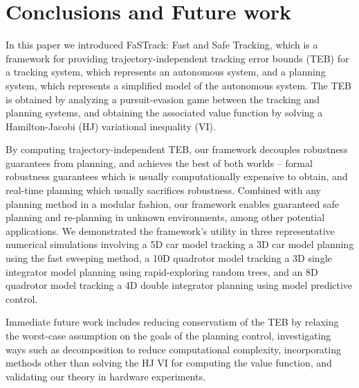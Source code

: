 \section{Conclusions and Future work}
In this paper we introduced FaSTrack: Fast and Safe Tracking, which is a framework for providing trajectory-independent tracking error bounds (TEB) for a tracking system, which represents an autonomous system, and a planning system, which represents a simplified model of the autonomous system.
The TEB is obtained by analyzing a pursuit-evasion game between the tracking and planning systems, and obtaining the associated value function by solving a Hamilton-Jacobi (HJ) variational inequality (VI).

By computing trajectory-independent TEB, our framework decouples robustness guarantees from planning, and achieves the best of both worlds -- formal robustness guarantees which is usually computationally expensive to obtain, and real-time planning which usually sacrifices robustness.
Combined with any planning method in a modular fashion, our framework enables guaranteed safe planning and re-planning in unknown environments, among other potential applications.
We demonstrated the framework's utility in three representative numerical simulations involving a 5D car model tracking a 3D car model planning using the fast sweeping method, a 10D quadrotor model tracking a 3D single integrator model planning using rapid-exploring random trees, and an 8D quadrotor model tracking a 4D double integrator planning using model predictive control.

Immediate future work includes reducing conservatism of the TEB by relaxing the worst-case assumption on the goals of the planning control, investigating ways such as decomposition to reduce computational complexity, incorporating methods other than solving the HJ VI for computing the value function, and validating our theory in hardware experiments.